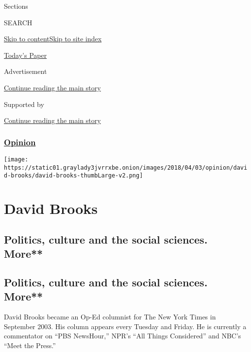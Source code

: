 Sections

SEARCH

\protect\hyperlink{site-content}{Skip to
content}\protect\hyperlink{site-index}{Skip to site index}

\href{https://myaccount.nytimes3xbfgragh.onion/auth/login?response_type=cookie\&client_id=vi}{}

\href{https://www.nytimes3xbfgragh.onion/section/todayspaper}{Today's
Paper}

Advertisement

\protect\hyperlink{after-top}{Continue reading the main story}

Supported by

\protect\hyperlink{after-sponsor}{Continue reading the main story}

\hypertarget{opinion}{%
\subsubsection{\texorpdfstring{\href{/section/opinion}{Opinion}}{Opinion}}\label{opinion}}

\texttt{[image: https://static01.graylady3jvrrxbe.onion/images/2018/04/03/opinion/david-brooks/david-brooks-thumbLarge-v2.png]}

\hypertarget{david-brooks}{%
\section{David Brooks}\label{david-brooks}}

\hypertarget{politics-culture-and-the-social-sciences-more}{%
\subsection{Politics, culture and the social sciences.
More**}\label{politics-culture-and-the-social-sciences-more}}

\hypertarget{politics-culture-and-the-social-sciences-more-1}{%
\subsection{Politics, culture and the social sciences.
More**}\label{politics-culture-and-the-social-sciences-more-1}}

David Brooks became an Op-Ed columnist for The New York Times in
September 2003. His column appears every Tuesday and Friday. He is
currently a commentator on ``PBS NewsHour,'' NPR's ``All Things
Considered'' and NBC's ``Meet the Press.''

